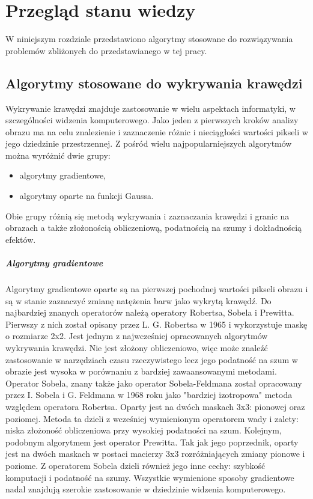 \chapter{Przegląd stanu wiedzy}
\label{chap:literature}

W niniejszym rozdziale przedstawiono algorytmy stosowane do rozwiązywania problemów zbliżonych do przedstawianego w tej pracy.

\section{Algorytmy stosowane do wykrywania krawędzi}

Wykrywanie krawędzi znajduje zastosowanie w wielu aspektach informatyki, w szczególności widzenia komputerowego. Jako jeden z pierwszych kroków analizy obrazu ma na celu znalezienie i zaznaczenie różnic i nieciągłości wartości pikseli w jego dziedzinie przestrzennej. Z pośród wielu najpopularniejszych algorytmów można wyróżnić dwie grupy\cite{survey_on_edge_detection}:
\begin{itemize}
    \item algorytmy gradientowe,
    \item algorytmy oparte na funkcji Gaussa.
\end{itemize}
Obie grupy różnią się metodą wykrywania i zaznaczania krawędzi i granic na obrazach a także złożonością obliczeniową, podatnością na szumy i dokładnością efektów.

\paragraph{Algorytmy gradientowe}

Algorytmy gradientowe oparte są na pierwszej pochodnej wartości pikseli obrazu i są w stanie zaznaczyć zmianę natężenia barw jako wykrytą krawędź\cite{survey_on_edge_detection}. Do najbardziej znanych operatorów należą operatory Robertsa, Sobela i Prewitta. Pierwszy z nich został opisany przez L. G. Robertsa w 1965 i wykorzystuje maskę o rozmiarze 2x2. Jest jednym z najwcześniej opracowanych algorytmów wykrywania krawędzi. Nie jest złożony obliczeniowo, więc może znaleźć zastosowanie w narzędziach czasu rzeczywistego lecz jego podatność na szum w obrazie jest wysoka w porównaniu z bardziej zawaansowanymi metodami\cite{survey_on_edge_detection}. Operator Sobela, znany także jako operator Sobela-Feldmana został opracowany przez I. Sobela i G. Feldmana w 1968 roku jako "bardziej izotropowa" metoda względem operatora Robertsa\cite{sobel_feldman}. Oparty jest na dwóch maskach 3x3: pionowej oraz poziomej. Metoda ta dzieli z wcześniej wymienionym operatorem wady i zalety: niska złożoność obliczeniowa przy wysokiej podatności na szum\cite{survey_on_edge_detection}. Kolejnym, podobnym algorytmem jest operator Prewitta. Tak jak jego poprzednik, oparty jest na dwóch maskach w postaci macierzy 3x3 rozróżniających zmiany pionowe i poziome. Z operatorem Sobela dzieli również jego inne cechy: szybkość komputacji i podatność na szumy\cite{survey_on_edge_detection}\cite{prewitt}. Wszystkie wymienione sposoby gradientowe nadal znajdują szerokie zastosowanie w dziedzinie widzenia komputerowego.

